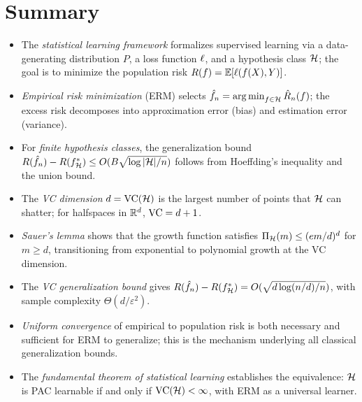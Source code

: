 \documentclass[11pt,a4paper]{article}
\begin{document}

\section{Summary}
\label{sec:summary}

\begin{itemize}
    \item The \emph{statistical learning framework} formalizes supervised
    learning via a data-generating distribution $P$, a loss function
    $\ell$, and a hypothesis class $\mathcal{H}$; the goal is to
    minimize the population risk $R(f) = \mathbb{E}[\ell(f(X), Y)]$.
    \item \emph{Empirical risk minimization} (ERM) selects
    $\hat{f}_n = \operatorname{arg\,min}_{f \in \mathcal{H}} \hat{R}_n(f)$; the excess
    risk decomposes into approximation error (bias) and estimation
    error (variance).
    \item For \emph{finite hypothesis classes}, the generalization
    bound $R(\hat{f}_n) - R(f_{\mathcal{H}}^*) \leq
    O(B\sqrt{\log|\mathcal{H}|/n})$ follows from Hoeffding's inequality
    and the union bound.
    \item The \emph{VC dimension} $d = \operatorname{VC}(\mathcal{H})$ is the largest
    number of points that $\mathcal{H}$ can shatter; for halfspaces in
    $\mathbb{R}^d$, $\operatorname{VC} = d + 1$.
    \item \emph{Sauer's lemma} shows that the growth function satisfies
    $\Pi_{\mathcal{H}}(m) \leq (em/d)^d$ for $m \geq d$, transitioning
    from exponential to polynomial growth at the VC dimension.
    \item The \emph{VC generalization bound} gives
    $R(\hat{f}_n) - R(f_{\mathcal{H}}^*) = O(\sqrt{d\log(n/d)/n})$,
    with sample complexity $\Theta(d/\varepsilon^2)$.
    \item \emph{Uniform convergence} of empirical to population risk
    is both necessary and sufficient for ERM to generalize; this
    is the mechanism underlying all classical generalization bounds.
    \item The \emph{fundamental theorem of statistical learning}
    establishes the equivalence: $\mathcal{H}$ is PAC learnable if and
    only if $\operatorname{VC}(\mathcal{H}) < \infty$, with ERM as a universal learner.
\end{itemize}

\end{document}
